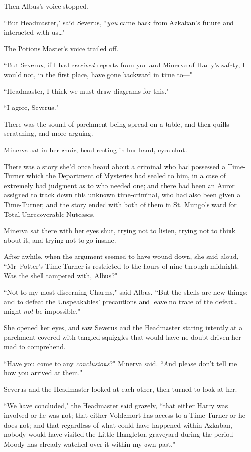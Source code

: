 Then Albus's voice stopped.

``But Headmaster," said Severus, ``\emph{you} came back from Azkaban's future and interacted with us{\ldots}"

The Potions Master's voice trailed off.

``But Severus, if I had \emph{received} reports from you and Minerva of Harry's safety, I would not, in the first place, have gone backward in time to—"

``Headmaster, I think we must draw diagrams for this."

``I agree, Severus."

There was the sound of parchment being spread on a table, and then quills scratching, and more arguing.

Minerva sat in her chair, head resting in her hand, eyes shut.

There was a story she'd once heard about a criminal who had possessed a Time-Turner which the Department of Mysteries had sealed to him, in a case of extremely bad judgment as to who needed one; and there had been an Auror assigned to track down this unknown time-criminal, who had also been given a Time-Turner; and the story ended with both of them in St. Mungo's ward for Total Unrecoverable Nutcases.

Minerva sat there with her eyes shut, trying not to listen, trying not to think about it, and trying not to go insane.

After awhile, when the argument seemed to have wound down, she said aloud, ``Mr~Potter's Time-Turner is restricted to the hours of nine \pm through midnight. Was the shell tampered with, Albus?"

``Not to my most discerning Charms," said Albus. ``But the shells are new things; and to defeat the Unspeakables' precautions and leave no trace of the defeat{\ldots} might \emph{not} be impossible."

She opened her eyes, and saw Severus and the Headmaster staring intently at a parchment covered with tangled squiggles that would have no doubt driven her mad to comprehend.

``Have you come to any \emph{conclusions}?" Minerva said. ``And please don't tell me how you arrived at them."

Severus and the Headmaster looked at each other, then turned to look at her.

``We have concluded," the Headmaster said gravely, ``that either Harry was involved or he was not; that either Voldemort has access to a Time-Turner or he does not; and that regardless of what could have happened within Azkaban, nobody would have visited the Little Hangleton graveyard during the period Moody has already watched over it within my own past."

